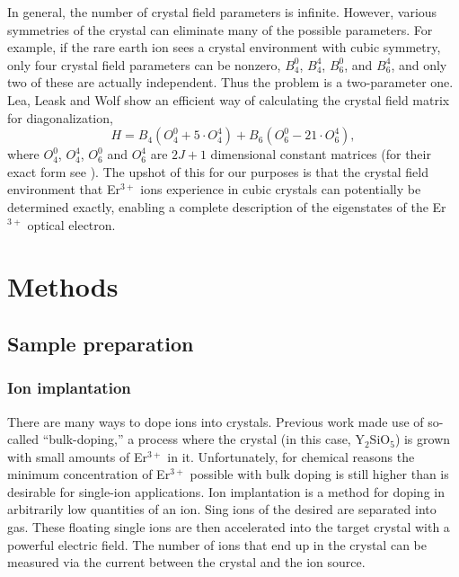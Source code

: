 \documentclass[12pt]{puthesis}
\newcommand{\erbium}[1][ ]{Er$^{3+}$#1}
\newcommand{\YSO}[1][ ]{Y$_{2}$SiO$_{5}$#1}
\begin{document}
In general, the number of crystal field parameters is infinite. However, various symmetries of the crystal can eliminate many of the possible parameters. For example, if the rare earth ion sees a crystal environment with cubic symmetry, only four crystal field parameters can be nonzero, $B_{4}^{0}$, $B_{4}^{4}$, $B_{6}^{0}$, and $B_{6}^{4}$, and only two of these are actually independent. Thus the problem is a two-parameter one. Lea, Leask and Wolf show an efficient way of calculating the crystal field matrix for diagonalization, 
\begin{equation}\label{eq:7}
  H = B_{4}(O_{4}^{0}+ 5\cdot O_{4}^{4}) + B_{6}(O_{6}^{0}-21\cdot O_{6}^{4}),
\end{equation}
where $O_{4}^{0}$, $O_{4}^{4}$, $O_{6}^{0}$ and $O_{6}^{4}$ are $2J+1$ dimensional constant matrices (for their exact form see \cite{Lea1962}). The upshot of this for our purposes is that the crystal field environment that \erbium ions experience in cubic crystals can potentially be determined exactly, enabling a complete description of the eigenstates of the \erbium optical electron. %




\chapter{Methods}

\section{Sample preparation}
\label{sec:sample-preparation}

\subsection{Ion implantation}
\label{sec:ion-implantation}

There are many ways to dope ions into crystals. Previous work made use of so-called ``bulk-doping,'' a process where the crystal (in this case, \YSO[]) is grown with small amounts of \erbium in it. Unfortunately, for chemical reasons the minimum concentration of \erbium possible with bulk doping is still higher than is desirable for single-ion applications. Ion implantation is a method for doping in arbitrarily low quantities of an ion. Sing ions of the desired are separated into gas. These floating single ions are then accelerated into the target crystal with a powerful electric field. The number of ions that end up in the crystal can be measured via the current between the crystal and the ion source. 
\end{document}
